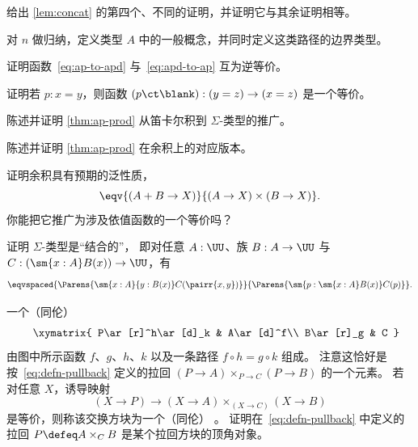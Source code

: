\begin{ex}\label{ex:fourth-concat}
  给出 \cref{lem:concat} 的第四个、不同的证明，并证明它与其余证明相等。
\end{ex}

\begin{ex}\label{ex:npaths}
  对 $n$ 做归纳，定义类型 $A$ 中的一般概念，并同时定义这类路径的边界类型。
\end{ex}

\begin{ex}\label{ex:ap-to-apd-equiv-apd-to-ap}
  证明函数~\eqref{eq:ap-to-apd} 与~\eqref{eq:apd-to-ap} 互为逆等价。
\end{ex}

\begin{ex}\label{ex:equiv-concat}
  证明若 $p:x=y$，则函数 $(p\ct \blank):(y=z) \to (x=z)$ 是一个等价。
\end{ex}

\begin{ex}\label{ex:ap-sigma}
  陈述并证明 \cref{thm:ap-prod} 从笛卡尔积到 $\Sigma$-类型的推广。
\end{ex}

\begin{ex}\label{ex:ap-coprod}
  陈述并证明 \cref{thm:ap-prod} 在余积上的对应版本。
\end{ex}

\begin{ex}\label{ex:coprod-ump}
  证明余积具有预期的泛性质，
  \[ \eqv{(A+B \to X)}{(A\to X)\times (B\to X)}. \]
  你能把它推广为涉及依值函数的一个等价吗？
\end{ex}

\begin{ex}\label{ex:sigma-assoc}
  证明 $\Sigma$-类型是“结合的”，
  即对任意 $A:\UU$、族 $B:A\to\UU$ 与 $C:(\sm{x:A} B(x))\to\UU$，有
  \[\eqvspaced{\Parens{\sm{x:A}{y:B(x)} C(\pairr{x,y})}}{\Parens{\sm{p:\sm{x:A}B(x)} C(p)}}. \]
\end{ex}

\begin{ex}\label{ex:pullback}
  一个（同伦）
  \begin{equation*}
  \vcenter{\xymatrix{
      P\ar[r]^h\ar[d]_k &
      A\ar[d]^f\\
      B\ar[r]_g &
      C
      }}
  \end{equation*}
  由图中所示函数 $f$、$g$、$h$、$k$ 以及一条路径 $f \circ h= g \circ k$ 组成。
  注意这恰好是按~\eqref{eq:defn-pullback} 定义的拉回 $(P\to A) \times_{P\to C} (P\to B)$ 的一个元素。
  若对任意 $X$，诱导映射
  \[ (X\to P) \to (X\to A) \times_{(X\to C)} (X\to B) \]
  是等价，则称该交换方块为一个（同伦）
  。
  证明在~\eqref{eq:defn-pullback} 中定义的拉回 $P \defeq A\times_C B$ 是某个拉回方块的顶角对象。
\end{ex}

